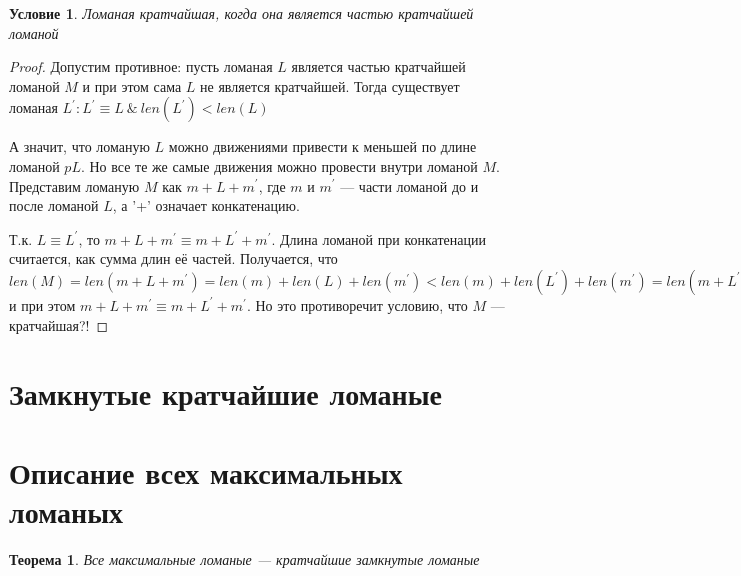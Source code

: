 \documentclass[12pt,a4paper, flushleft]{article}
\newtheorem{Th}{Теорема}[section]
\newtheorem{Con}{Условие}[section]
\newcommand{\p}[1]{#1^{\prime}}
\begin{document}
\begin{Con}
	Ломаная кратчайшая, когда она является частью кратчайшей ломаной
\end{Con}
\begin{proof}
	Допустим противное: пусть ломаная $L$ является частью кратчайшей ломаной $M$ и при этом сама $L$ не является кратчайшей. Тогда существует ломаная $\p L: \p L\equiv L~\&~ len(\p L)<len(L)$
	
	А значит, что ломаную $L$ можно движениями привести к меньшей по длине ломаной $p L$. Но все те же самые движения можно провести внутри ломаной $M$. Представим ломаную $M$ как $m + L + \p m$, где $m$ и $\p m$ --- части ломаной до и после ломаной $L$, а '+' означает конкатенацию. 
	
	Т.к. $L\equiv \p L$, то $m + L + \p m\equiv m+\p L + \p m$. Длина ломаной при конкатенации считается, как сумма длин её частей. Получается, что $len(M) = len(m+L+\p m) = len(m) + len(L) + len(\p m) < len(m) + len(\p L) + len(\p m) = len(m+\p L + \p m)$ и при этом $m+L+\p m\equiv m+\p L+\p m$. Но это противоречит условию, что $M$ --- кратчайшая?!
	
	
\end{proof}

\section{Замкнутые кратчайшие ломаные}

\section{Описание всех максимальных ломаных}
\begin{Th}
	Все максимальные ломаные --- кратчайшие замкнутые ломаные	
\end{Th}
\end{document}
